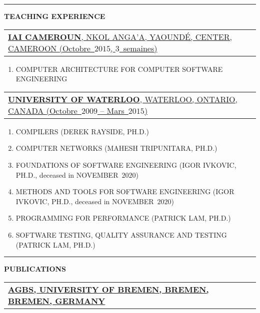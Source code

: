 \documentclass[9pt,a4paper]{article} %
\makeatletter
\newcommand{\headerrow}[2]
{\begin{tabular*}{\linewidth}{l@{\extracolsep{\fill}}r}
	#1 &
	#2 \\
\end{tabular*}}
\newcommand{\headerrowONE}[1]{\headerrow{#1}{}}
\makeatother
\begin{document}
\hrule
\begin{center}
{\large \textbf{TEACHING EXPERIENCE}}
\end{center}

\vspace{0.5em}

\headerrowONE{\href{http://iaicameroun.com}{\textbf{IAI CAMEROUN}, NKOL ANGA'A, YAOUNDÉ, CENTER, CAMEROON (Octobre~$2015$, $3$~semaines)}}
\begin{enumerate}
	\item COMPUTER ARCHITECTURE FOR COMPUTER SOFTWARE ENGINEERING
\end{enumerate}

\vspace{0.5em}

\headerrowONE{\href{http://ece.uwaterloo.ca}{\textbf{UNIVERSITY OF WATERLOO}, WATERLOO, ONTARIO, CANADA (Octobre~$2009$ -- Mars~$2015$)}}

\begin{enumerate}
	\itemsep -0.3em
	\item COMPILERS (DEREK RAYSIDE, PH.D.)
	\item COMPUTER NETWORKS (MAHESH TRIPUNITARA, PH.D.)
	\item FOUNDATIONS OF SOFTWARE ENGINEERING (IGOR IVKOVIC, PH.D., deceased in NOVEMBER~$2020$)
	\item METHODS AND TOOLS FOR SOFTWARE ENGINEERING (IGOR IVKOVIC, PH.D., deceased in NOVEMBER~$2020$)
	\item PROGRAMMING FOR PERFORMANCE (PATRICK LAM, PH.D.)
	\item SOFTWARE TESTING, QUALITY ASSURANCE AND TESTING (PATRICK LAM, PH.D.)
\end{enumerate}


\vspace{1em}

\hrule
\begin{center}
{\large \textbf{PUBLICATIONS}}
\end{center}

\vspace{0.5em}

\headerrowONE{\href{http://www.informatik.uni-bremen.de/agbs}{
	\textbf{AGBS, UNIVERSITY OF BREMEN, BREMEN, BREMEN, GERMANY}}}

\vspace{0.3em}
\end{document}
